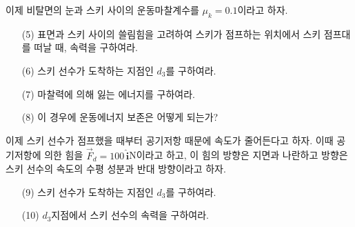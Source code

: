 \documentclass[floatfix,nofootinbib,superscriptaddress,fleqn]{revtex4-2}
\begin{document}
이제 비탈면의 눈과 스키 사이의 운동마찰계수를 $\mu_k=0.1$이라고 하자.
\begin{itemize}
\item[(5)]  표면과 스키 사이의 쓸림힘을 고려하여 스키가 점프하는
  위치에서 스키 점프대를 떠날 때, 속력을 구하여라.
\item[(6)] 스키 선수가 도착하는 지점인 $d_3$를 구하여라.
\item[(7)]  마찰력에 의해 잃는 에너지를 구하여라.
\item[(8)] 이 경우에 운동에너지 보존은 어떻게 되는가? 
\end{itemize}

이제 스키 선수가 점프했을 때부터 공기저항 때문에 속도가 줄어든다고
하자. 이때 공기저항에 의한 힘을 $\vec{F}_d=100\,\hat{\bm{i}}$N이라고
하고, 이 힘의 방향은 지면과 나란하고 방향은 스키 선수의 속도의 수평
성분과 반대 방향이라고 하자. 
\begin{itemize}
\item[(9)]  스키 선수가 도착하는 지점인 $d_3$를 구하여라.
\item[(10)] $d_3$지점에서 스키 선수의 속력을 구하여라.   
\end{itemize}
\vspace{1cm}
\end{document}
